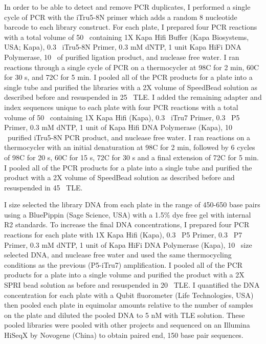 In order to be able to detect and remove PCR duplicates, I performed a single   
cycle of PCR with the iTru5-8N primer which adds a random 8 nucleotide barcode to 
each library construct.  
For each plate, I prepared four PCR reactions with a total volume of 
50 \uL\ containing 1X Kapa Hifi Buffer (Kapa Biosystems, USA; Kapa),
0.3 \uM\ iTru5-8N Primer, 0.3 mM dNTP, 1 unit Kapa HiFi DNA Polymerase,
10 \uL\ of purified ligation product, and nuclease free water.
I ran reactions through a single cycle of PCR on a thermocycler at 98\degree C for 2 min, 
60\degree C for 30 s, and 72\degree C for 5 min. 
I pooled all of the PCR products for a plate into a single tube and purified the
libraries with a 2X volume of SpeedBead solution as described before and 
resuspended in 25 \uL\ TLE.
I added the remaining adapter and index sequences unique to each plate with four PCR
reactions with a total volume of 50 \uL\ containing 1X Kapa Hifi (Kapa),
0.3 \uM\ iTru7 Primer, 0.3 \uM\ P5 Primer, 0.3 mM dNTP, 1 unit of Kapa Hifi DNA Polymerase (Kapa),
10 \uL\ purified iTru5-8N PCR product, and nuclease free water.
I ran reactions on a thermocycler with an initial denaturation at 98\degree C for 2 min, 
followed by 6 cycles of 98\degree C for 20 s, 60\degree C for 15 s, 72\degree C 
for 30 s and a final extension of 72\degree C for 5 min.
I pooled all of the PCR products for a plate into a single tube and purified the
product with a 2X volume of SpeedBead solution as described before and 
resuspended in 45 \uL\ TLE.

I size selected the library DNA from each plate in the range of 450-650 base pairs using
a BluePippin (Sage Science, USA) with a 1.5\% dye free gel with internal R2 standards. 
To increase the final DNA concentrations, I prepared four PCR reactions for each 
plate with 1X Kapa Hifi (Kapa), 0.3 \uM\ P5 Primer, 0.3 \uM\ P7 Primer, 0.3 mM dNTP, 
1 unit of Kapa HiFi DNA Polymerase (Kapa), 10 \uL\ size selected DNA, and 
nuclease free water and used the same thermocycling conditions as the previous
(P5-iTru7) amplification.
I pooled all of the PCR products for a plate into a single volume and purified 
the product with a 2X SPRI bead solution as before and resuspended in 20 \uL\ TLE. 
I quantified the DNA concentration for each plate with a Qubit fluorometer 
(Life Technologies, USA) then pooled each plate in equimolar amounts relative 
to the number of samples on the plate and diluted the pooled DNA to 5 nM with
TLE solution. 
These pooled libraries were pooled with other projects and sequenced on an Illumina 
HiSeqX by Novogene (China) to obtain paired end, 150 base pair sequences. 


